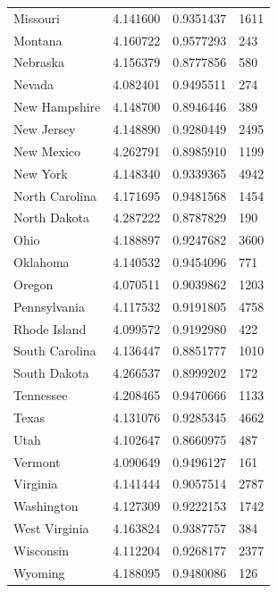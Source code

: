 \documentclass[
  english,
  man]{apa6}
\begin{document}
\begin{landscape}
\begin{longtable}[t]{llll}
Missouri & 4.141600 & 0.9351437 & 1611\\
\addlinespace
Montana & 4.160722 & 0.9577293 & 243\\
Nebraska & 4.156379 & 0.8777856 & 580\\
Nevada & 4.082401 & 0.9495511 & 274\\
New Hampshire & 4.148700 & 0.8946446 & 389\\
New Jersey & 4.148890 & 0.9280449 & 2495\\
\addlinespace
New Mexico & 4.262791 & 0.8985910 & 1199\\
New York & 4.148340 & 0.9339365 & 4942\\
North Carolina & 4.171695 & 0.9481568 & 1454\\
North Dakota & 4.287222 & 0.8787829 & 190\\
Ohio & 4.188897 & 0.9247682 & 3600\\
\addlinespace
Oklahoma & 4.140532 & 0.9454096 & 771\\
Oregon & 4.070511 & 0.9039862 & 1203\\
Pennsylvania & 4.117532 & 0.9191805 & 4758\\
Rhode Island & 4.099572 & 0.9192980 & 422\\
South Carolina & 4.136447 & 0.8851777 & 1010\\
\addlinespace
South Dakota & 4.266537 & 0.8999202 & 172\\
Tennessee & 4.208465 & 0.9470666 & 1133\\
Texas & 4.131076 & 0.9285345 & 4662\\
Utah & 4.102647 & 0.8660975 & 487\\
Vermont & 4.090649 & 0.9496127 & 161\\
\addlinespace
Virginia & 4.141444 & 0.9057514 & 2787\\
Washington & 4.127309 & 0.9222153 & 1742\\
West Virginia & 4.163824 & 0.9387757 & 384\\
Wisconsin & 4.112204 & 0.9268177 & 2377\\
Wyoming & 4.188095 & 0.9480086 & 126\\*
\end{longtable}
\end{landscape}
\endgroup{}

\begingroup\fontsize{12}{14}\selectfont
\end{document}
